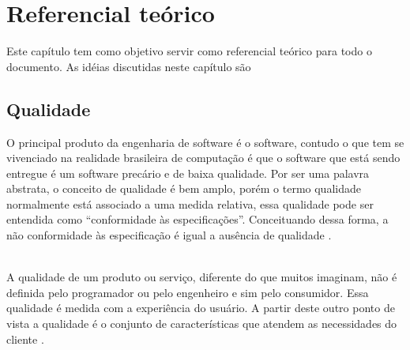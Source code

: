 
\chapter[Referencial Teórico]{Referencial teórico}
	
	Este capítulo tem como objetivo servir como referencial teórico para todo o documento. As idéias discutidas neste capítulo são
	
\section{Qualidade}
	O principal produto da engenharia de software é o software, contudo o que tem se vivenciado na realidade brasileira de computação é que o software que está sendo entregue é um software precário e de baixa qualidade. Por ser uma palavra abstrata, o conceito de qualidade é bem amplo, porém o termo qualidade normalmente está associado a uma medida relativa, essa qualidade pode ser entendida como “conformidade às especificações”. Conceituando dessa forma, a não conformidade às especificação é igual a ausência de qualidade \citep{Paduelli}.
 
 \\ A qualidade de um produto ou serviço, diferente do que muitos imaginam, não é definida pelo programador ou pelo engenheiro e sim pelo consumidor. Essa qualidade é medida com a experiência do usuário. A partir deste outro ponto de vista a qualidade é o conjunto de características que atendem as necessidades do cliente \citep{armenise_continuous_2015}.